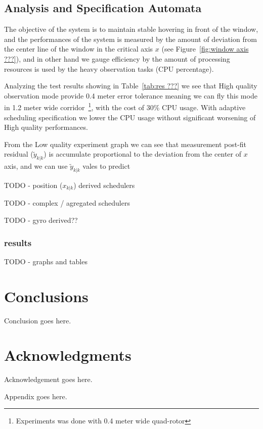 \documentclass{sig-alternate-ipsn13}
\begin{document}
\subsection{Analysis and Specification Automata}

The objective of the system is to maintain stable hovering in front of the window, and the performances of the system is measured by the amount of deviation from the center line of the window in the critical axis $x$ (see Figure~\ref{fig:window axis ???}), and in other hand we gauge efficiency by the amount of processing resources is used by the heavy observation tasks (CPU percentage).

Analyzing the test results showing in Table~\ref{tab:res ???} we see that High quality observation mode provide 0.4 meter error tolerance meaning we can fly this mode in 1.2 meter wide corridor~\footnote{Experiments was done with 0.4 meter wide quad-rotor}, with the cost of 30\% CPU usage. 
With adaptive scheduling specification we lower the CPU usage without significant worsening of High quality performances.

From the Low quality experiment graph we can see that measurement post-fit residual ($\tilde{y}_{k|k}$) is accumulate proportional to the deviation from the center of $x$ axis, and we can use $\tilde{y}_{k|k}$ vales to predict 


TODO - position ($x_{k|k}$)  derived schedulers

TODO - complex / agregated schedulers

TODO - gyro derived??


\subsubsection{results}
TODO - graphs and tables


\section{Conclusions}
Conclusion goes here.


\section*{Acknowledgments}
Acknowledgement goes here.


%

%
%
\appendix

Appendix goes here.

\end{document}
